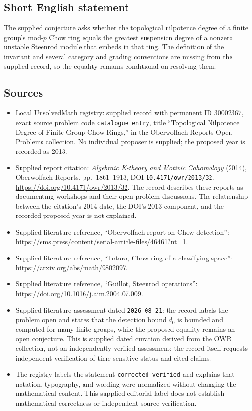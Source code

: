 \documentclass[11pt]{article}
\begin{document}
\subsection{Short English statement}
The supplied conjecture asks whether the topological nilpotence degree of a finite group's mod-\(p\) Chow ring equals the greatest suspension degree of a nonzero unstable Steenrod module that embeds in that ring. The definition of the invariant and several category and grading conventions are missing from the supplied record, so the equality remains conditional on resolving them.
\subsection{Sources}
\begin{itemize}
\item Local UnsolvedMath registry: supplied record with permanent ID \(30002367\), exact source problem code \texttt{catalogue entry}, title ``Topological Nilpotence Degree of Finite-Group Chow Rings,'' in the Oberwolfach Reports Open Problems collection. No individual proposer is supplied; the proposed year is recorded as 2013.
\item Supplied report citation: \emph{Algebraic K-theory and Motivic Cohomology} (2014), Oberwolfach Reports, pp.\ 1861--1913, DOI \texttt{10.4171/owr/2013/32}. \url{https://doi.org/10.4171/owr/2013/32}. The record describes these reports as documenting workshops and their open-problem discussions. The relationship between the citation's 2014 date, the DOI's 2013 component, and the recorded proposed year is not explained.
\item Supplied literature reference, ``Oberwolfach report on Chow detection'': \url{https://ems.press/content/serial-article-files/46461?nt=1}.
\item Supplied literature reference, ``Totaro, Chow ring of a classifying space'': \url{https://arxiv.org/abs/math/9802097}.
\item Supplied literature reference, ``Guillot, Steenrod operations'': \url{https://doi.org/10.1016/j.aim.2004.07.009}.
\item Supplied literature assessment dated \texttt{2026-08-21}: the record labels the problem open and states that the detection bound \(d_0\) is bounded and computed for many finite groups, while the proposed equality remains an open conjecture. This is supplied dated curation derived from the OWR collection, not an independently verified assessment; the record itself requests independent verification of time-sensitive status and cited claims.
\item The registry labels the statement \texttt{corrected\_verified} and explains that notation, typography, and wording were normalized without changing the mathematical content. This supplied editorial label does not establish mathematical correctness or independent source verification.
\end{itemize}
\end{document}
